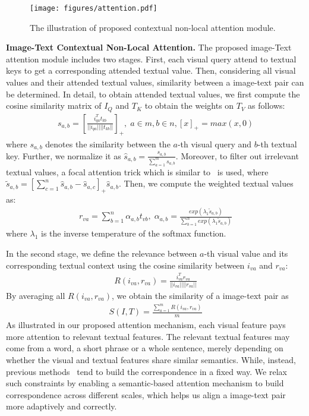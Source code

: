 \documentclass[final]{cvpr}
\begin{document}
\begin{figure}
    \centering
    \texttt{[image: figures/attention.pdf]}
    \caption{The illustration of proposed contextual non-local attention module. }
    \label{fig_attention}
\end{figure}



\textbf{Image-Text Contextual Non-Local Attention.} The proposed image-Text attention module includes two stages. 
First, each visual query attend to textual keys to get a corresponding attended textual value. 
Then, considering all visual values and their attended textual values, similarity between a image-text pair can be determined. 
In detail, to obtain attended textual values, we first compute the cosine similarity matrix of $I_{Q}$ and $T_{K}$ to obtain the weights on $T_{V}$ as follows:
\begin{align}\label{eq_i2t_attn}
    s_{a,b}=[\frac{i^{T}_{qa}t_{kb}}{||i_{qa}||||t_{kb}||}]_{+},\;a\in m,b\in n,[x]_{+}=max(x,0)
\end{align}
where $s_{a,b}$ denotes the similarity between the $a$-th visual query and $b$-th textual key. Further, we normalize it as $\hat s_{a,b}=\frac{s_{a,b}}{\sum_{a=1}^{m}s_{a,b}}$. Moreover, to filter out irrelevant textual values, a focal attention trick which is similar to~\cite{Liu2019FocusYA} is used, where $\tilde{s}_{a,b}=[\sum_{c=1}^{n}\hat s_{a,b}-\hat s_{a,c}]_+\hat s_{a,b}$. Then, we compute the weighted textual values as:
\begin{align}\label{eq_i2t_weight}
    r_{va}=\sum_{b=1}^{n}\alpha_{a,b} t_{vb},\;\alpha_{a,b}=\frac{exp(\lambda_1\tilde{s}_{a,b})}{\sum_{b=1}^{n}exp(\lambda_1\tilde{s}_{a,b})}
\end{align}
where $\lambda_1$ is the inverse temperature of the softmax function.

In the second stage, we define the relevance between $a$-th visual value and its corresponding textual context using the cosine similarity between $i_{va}$ and $r_{va}$:
\begin{align}\label{eq_i2t_sim}
    R(i_{va},r_{va})=\frac{i_{va}^{T}r_{va}}{||i_{va}||||r_{va}||}    
\end{align}
By averaging all $R(i_{va},r_{va})$, we obtain the similarity of a image-text pair as
\begin{align}\label{eq_i2t_final}
    S(I,T)=\frac{\sum_{a=1}^{m}R(i_{va},r_{va})}{m}
\end{align}
As illustrated in our proposed attention mechanism, each visual feature pays more attention to relevant textual features. The relevant textual features may come from a word, a short phrase or a whole sentence, merely depending on whether the visual and textual features share similar semantics. While, instead, previous methods~\cite{wang2020vitaa,jing2020pose} tend to build the correspondence in a fixed way. We relax such constraints by enabling a semantic-based attention mechanism to build correspondence across different scales, which helps us align a image-text pair more adaptively and correctly.
\end{document}
